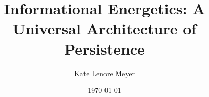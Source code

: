 \documentclass[aps,prd,twocolumn,showpacs,superscriptaddress,groupedaddress,nofootinbib,english]{revtex4-2}
\begin{document}
\title{Informational Energetics: A Universal Architecture of Persistence}

\author{Kate Lenore Meyer}

\date{\today}



\maketitle









%






\appendix


\end{document}
